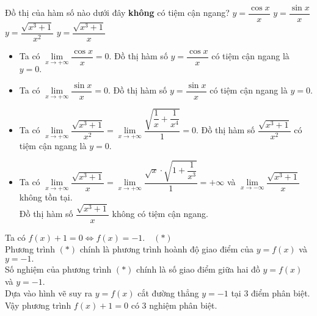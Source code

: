 \documentclass[12pt,a4paper,oneside]{book}
\begin{document}
\begin{ex}%
Đồ thị của hàm số nào dưới đây \textbf{không} có tiệm cận ngang?
	\choice
	{$ y=\dfrac{\cos x}{x} $ }
	{$ y=\dfrac{\sin x}{x} $ }
	{$ y=\dfrac{\sqrt{x^3+1}}{x^2} $ }
	{\True $ y=\dfrac{\sqrt{x^3+1}}{x} $ }
	\loigiai
	{\begin{itemize}
			\item Ta có $ \lim\limits_{x\to +\infty} \dfrac{\cos x}{x}  = 0. $ Đồ thị hàm số $ y=\dfrac{\cos x}{x} $ có tiệm cận ngang là $ y =0. $
			\item Ta có $ \lim\limits_{x\to +\infty} \dfrac{\sin x}{x}  = 0. $ Đồ thị hàm số $ y=\dfrac{\sin x}{x} $ có tiệm cận ngang là $ y =0. $
			\item Ta có $ \lim\limits_{x\to +\infty} \dfrac{\sqrt{x^3+1}}{x^2}  =\lim\limits_{x\to +\infty} \dfrac{\sqrt{\dfrac{1}{x}+\dfrac{1}{x^4}}}{1}= 0. $ Đồ thị hàm số $ \dfrac{\sqrt{x^3+1}}{x^2} $ có tiệm cận ngang là $ y =0. $
			\item Ta có $ \lim\limits_{x\to +\infty} \dfrac{\sqrt{x^3+1}}{x}  =\lim\limits_{x\to +\infty} \dfrac{\sqrt{x} \cdot \sqrt{1+\dfrac{1}{x^3}}}{1} =  +\infty $ và $ \lim\limits_{x\to -\infty} \dfrac{\sqrt{x^3+1}}{x}$ không tồn tại.\\
			Đồ thị hàm số $ \dfrac{\sqrt{x^3+1}}{x} $ không có tiệm cận ngang. 
		\end{itemize}
	}
\end{ex}
\begin{ex}%
{}	
	
	\loigiai
	{Ta có $ f(x) +1 =0 \Leftrightarrow f(x) = -1. \quad (*)$\\
		Phương trình $ (*) $ chính là phương trình hoành độ giao điểm của $ y = f(x) $ và $ y = -1. $ \\Số nghiệm của phương trình $ (*) $ chính là số giao điểm giữa hai đồ $ y=f(x) $ và $ y = -1 $.\\
		Dựa vào hình vẽ suy ra $ y=f(x) $ cắt đường thẳng $ y = -1 $ tại $ 3 $ điểm phân biệt.\\
		Vậy phương trình $ f(x)+1=0 $ có $ 3 $ nghiệm phân biệt.
		
	}
\end{ex}
\end{document}
